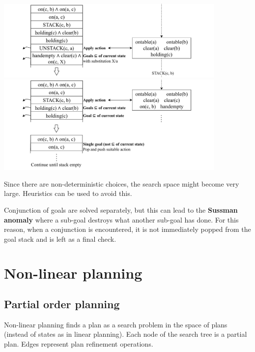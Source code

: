 \begin{example}
\begin{center}
        \includegraphics[width=0.85\textwidth]{img/_strips_example7.pdf}
        \includegraphics[width=0.85\textwidth]{img/_strips_example8.pdf}
    \end{center}
\end{example}

Since there are non-deterministic choices, the search space might become very large.
Heuristics can be used to avoid this.

Conjunction of goals are solved separately, but this can lead to the  \textbf{Sussman anomaly} 
where a sub-goal destroys what another sub-goal has done.
For this reason, when a conjunction is encountered, it is not immediately popped from the goal stack
and is left as a final check.



\section{Non-linear planning}


\subsection{Partial order planning}

Non-linear planning finds a plan as a search problem in the space of plans (instead of states as in linear planning).
Each node of the search tree is a partial plan. Edges represent plan refinement operations.

